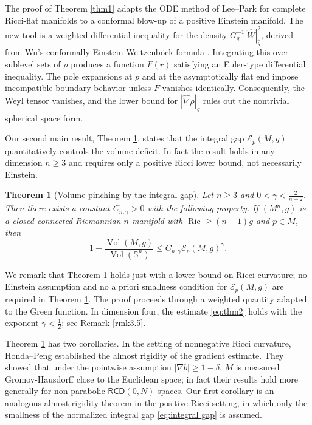\documentclass[11pt]{amsart}
\theoremstyle{plain}
\newtheorem{theorem}{Theorem}[section]
\numberwithin{equation}{section}
\renewcommand{\S}{\mathbb{S}}
\newcommand{\E}{\mathcal{E}}
\DeclareMathOperator{\ric}{Ric}
\DeclareMathOperator{\vol}{Vol}
\newcommand{\hn}{\widehat{\nabla}}
\newcommand{\hg}{\widehat{g}}
\newcommand{\hw}{\widehat{W}}
\begin{document}
The proof of Theorem \ref{thm1} adapts the ODE method of Lee--Park for complete Ricci-flat manifolds \cite{LP25} to a conformal blow-up of a positive Einstein manifold. The new tool is a weighted differential inequality for the density $G_q^{-1}|\hw|^2_{\hg}$, derived from Wu's conformally Einstein Weitzenb\"ock formula \cite{Wu2017}. Integrating this over sublevel sets of $\rho$ produces a function $F(r)$ satisfying an Euler-type differential inequality. The pole expansions at $p$ and at the asymptotically flat end impose incompatible boundary behavior unless $F$ vanishes identically. Consequently, the Weyl tensor vanishes, and the lower bound for $|\hn\rho|_{\hg}$ rules out the nontrivial spherical space form.

Our second main result, Theorem \ref{thm2}, states that the integral gap $\E_p(M,g)$ quantitatively controls the volume deficit. In fact the result holds in any dimension $n\ge 3$ and requires only a positive Ricci lower bound, not necessarily Einstein.

\begin{theorem}[Volume pinching by the integral gap]\label{thm2}
Let $n\ge 3$ and $0<\gamma<\frac{2}{n+2}$. Then there exists a constant $C_{n,\gamma}>0$ with the following property. If $(M^n,g)$ is a closed connected Riemannian $n$-manifold with $\ric\ge(n-1)g$ and $p\in M$, then 
\begin{equation}\label{eq:thm2}
    1-\frac{\vol(M,g)}{\vol(\S^n)}\le C_{n,\gamma}\E_p(M,g)^\gamma.
\end{equation}
\end{theorem}

We remark that Theorem \ref{thm2} holds just with a lower bound on Ricci curvature; no Einstein assumption and no a priori smallness condition for $\E_p(M,g)$ are required in Theorem \ref{thm2}. 
The proof proceeds through a weighted quantity adapted to the Green function. In dimension four, the estimate \eqref{eq:thm2} holds with the exponent $\gamma<\frac{1}{2}$; see Remark \ref{rmk3.5}.

Theorem \ref{thm2} has two corollaries.  In the setting of nonnegative Ricci curvature, Honda--Peng \cite{HondaPeng} established the almost rigidity of the gradient estimate. They showed that under the pointwise assumption $|\nabla b|\ge 1-\delta$, $M$ is measured Gromov-Hausdorff close to the Euclidean space; in fact their results hold more generally for non-parabolic $\mathsf{RCD}(0,N)$ spaces. Our first corollary is an analogous almost rigidity theorem in the positive-Ricci setting, in which only the smallness of the normalized integral gap \eqref{eq:integral gap} is assumed.
\end{document}
